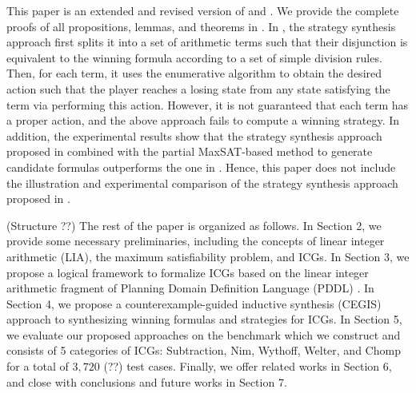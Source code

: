 \documentclass[review]{elsarticle}
\begin{document}
This paper is an extended and revised version of \cite{WuFXLQCR2020} and \cite{FanYD2024}.
We provide the complete proofs of all propositions, lemmas, and theorems in \cite{FanYD2024}. %
In \cite{WuFXLQCR2020}, the strategy synthesis approach first splits it into a set of arithmetic terms such that their disjunction is equivalent to the winning formula according to a set of simple division rules.
Then, for each term, it uses the enumerative algorithm to obtain the desired action such that the player reaches a losing state from any state satisfying the term via performing this action.
However, it is not guaranteed that each term has a proper action, and the above approach fails to compute a winning strategy.
In addition, the experimental results show that the strategy synthesis approach proposed in \cite{FanYD2024} combined with the partial MaxSAT-based method to generate candidate formulas outperforms the one in \cite{WuFXLQCR2020}.
Hence, this paper does not include the illustration and experimental comparison of the strategy synthesis approach proposed in \cite{WuFXLQCR2020}.


	(Structure ??)
	The rest of the paper is organized as follows. 
	In Section 2, we provide some necessary preliminaries, including the concepts of linear integer arithmetic (LIA), the maximum satisfiability problem, and ICGs.
	In Section 3, we propose a logical framework to formalize ICGs based on the linear integer arithmetic fragment of Planning Domain Definition Language (PDDL) \cite{FoxL2003}.
	In Section 4, we propose a counterexample-guided inductive synthesis (CEGIS) approach to synthesizing winning formulas and strategies for ICGs.
	In Section 5, we evaluate our proposed approaches on the benchmark which we construct and consists of 5 categories of ICGs: Subtraction, Nim, Wythoff, Welter, and Chomp for a total of $3,720$ (??) test cases.  
	Finally, we offer related works in Section 6, and close with conclusions and future works in Section 7.
\end{document}
